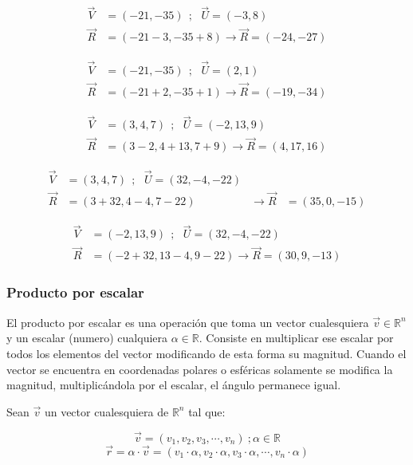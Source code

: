     \begin{align*}
        \vec{V}& =(-21,-35)  \ \ ;\ \ \  \vec{U} =(-3,8)		\\
        \vec{R}&= (-21-3 ,-35+8  )  \rightarrow \vec{R} = (-24 ,-27  )
    \end{align*}

    \begin{align*}
        \vec{V}& =(-21,-35)  \ \ ;\ \ \  \vec{U} =(2,1)		\\
        \vec{R}&= (-21+2 , -35+1 )   \rightarrow \vec{R} = (-19 ,-34  )
    \end{align*}




    \begin{align*}
        \vec{V}& =(3,4,7)  \ \ ;\ \ \   \vec{U} =(-2,13,9)		\\
        \vec{R}&= (3-2 ,4+13 ,7+9 )   \rightarrow \vec{R} = (4,17,16 )
    \end{align*}

    \begin{align*}
        \vec{V}& =(3,4,7)  \ \ ;\ \ \  \vec{U} =(32,-4,-22)		\\
        \vec{R}&= (3+32, 4-4,7-22 )  & \rightarrow \vec{R} &= ( 35,0 ,-15 )
    \end{align*}

    \begin{align*}
        \vec{V}& =(-2,13,9)  \ \ ;\ \ \   \vec{U} =(32,-4,-22)		\\
        \vec{R}&= (-2+32 ,13-4 ,9-22 )  \rightarrow \vec{R} = (30, 9,-13 )
    \end{align*}


    \subsubsection{Producto por escalar}

    El producto por escalar es una operación que toma un vector cualesquiera
    $\vec{v} \in \mathbb{R}^n$ y un escalar (numero) cualquiera $\alpha \in
    \mathbb{R}$. Consiste en multiplicar ese escalar por todos los elementos del
    vector modificando de esta forma su magnitud. Cuando el vector se encuentra
    en coordenadas polares o esféricas solamente se modifica la magnitud,
    multiplicándola por el escalar, el ángulo permanece igual.

    Sean $\vec{v}$ un  vector cualesquiera de $\mathbb{R}^n$  tal que:

    $$\vec{v}=(v_1,v_2,v_3,\cdots,v_n)\ ; \alpha \in \mathbb{R} $$
    $$\vec{r}=\alpha\cdot\vec{v}=(v_1\cdot\alpha,v_2\cdot\alpha,v_3\cdot\alpha,\cdots,v_n\cdot\alpha)$$


